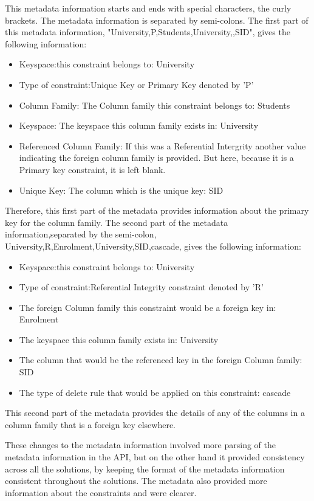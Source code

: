 This metadata information starts and ends with special characters, the curly
brackets. The metadata information is separated by semi-colons. The first part
of this metadata information, "University,P,Students,University,,SID", gives the
following information:
\begin{itemize}
\item Keyspace:this constraint belongs to: University
\item Type of constraint:Unique Key or Primary Key denoted by 'P'
\item Column Family: The Column family this constraint belongs to: Students
\item Keyspace: The keyspace this column family exists in: University
\item Referenced Column Family: If this was a Referential Intergrity another
value indicating the foreign column family is provided. But here, because it is a Primary key constraint, it
is left blank.
\item Unique Key: The column which is the unique key: SID
\end{itemize}

Therefore, this first part of the
metadata provides information about the primary key for the column family.
The second part of the metadata information,separated by the semi-colon,
University,R,Enrolment,University,SID,cascade, gives the following information:

\begin {itemize}
\item Keyspace:this constraint belongs to: University
\item Type of constraint:Referential Integrity constraint denoted by 'R'
\item The foreign Column family this
constraint would be a foreign key in: Enrolment
\item The keyspace this column family exists in: University 
\item The column that would be the referenced key in the foreign Column family:
SID 
\item The type of delete rule that would be applied on this constraint:
cascade
\end{itemize}
This second part of the metadata provides the details of any of the columns in a
column family that is a foreign key elsewhere.

These changes to the metadata information involved more parsing of the metadata
information in the API, but on the other hand it provided consistency across all
the solutions, by keeping the format of the metadata information consistent
throughout the solutions. The metadata also provided more information about the
constraints and were clearer.


